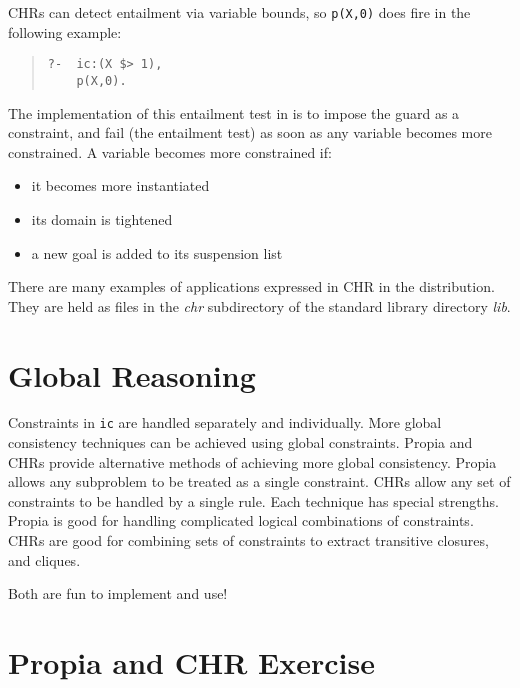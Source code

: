 CHRs can detect entailment via variable bounds, so \verb.p(X,0).
does fire in the following example:
\begin{quote}
\begin{verbatim}
?-  ic:(X $> 1),
    p(X,0).
\end{verbatim}
\end{quote}

The implementation of this entailment test in \eclipse{} is to impose
the guard as a constraint, and fail (the entailment test) as soon as
any variable becomes more constrained.
A variable becomes more constrained if:
\begin{itemize}
\item it becomes more instantiated
\item its domain is tightened
\item a new goal is added to its suspension list
\end{itemize}

There are many examples of applications expressed in CHR in the
\eclipse{} distribution.
They are held as files in the {\em chr} subdirectory of the standard
\eclipse{} library directory {\em lib}. 


\section{Global Reasoning}
Constraints in {\tt ic} are handled separately and individually.  More
global consistency techniques can be achieved using global
constraints.
Propia and CHRs provide alternative methods of achieving more global
consistency.
Propia allows any subproblem to be treated as a single constraint.
CHRs allow any set of constraints to be handled by a single rule.
Each technique has special strengths.  Propia is good for handling
complicated logical combinations of constraints.  CHRs are good for
combining sets of constraints to extract transitive closures, and
cliques.

Both are fun to implement and use!

\section{Propia and CHR Exercise}


